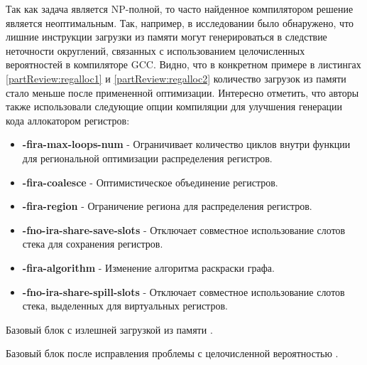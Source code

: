 Так как задача является NP-полной, то часто найденное компилятором решение является неоптимальным. Так, например, в исследовании  \cite{melnik2010case} было обнаружено, что лишние инструкции загрузки из памяти могут генерироваться в следствие неточности округлений, связанных с использованием целочисленных вероятностей в компиляторе GCC.  Видно, что в конкретном примере в листингах \ref{partReview:regalloc1} и  \ref{partReview:regalloc2} количество загрузок из памяти стало меньше после примененной оптимизации. Интересно отметить, что авторы также использовали следующие опции компиляции для улучшения генерации кода аллокатором регистров:
\begin{itemize}
\item \textbf{-fira-max-loops-num} - Ограничивает количество циклов внутри функции для региональной оптимизации распределения регистров.
\item \textbf{-fira-coalesce} - Оптимистическое объединение регистров.
\item \textbf{-fira-region} - Ограничение региона для распределения регистров.
\item \textbf{-fno-ira-share-save-slots} - Отключает совместное использование слотов стека для сохранения регистров.
\item \textbf{-fira-algorithm} - Изменение алгоритма раскраски графа.
\item \textbf{-fno-ira-share-spill-slots} - Отключает совместное использование слотов стека, выделенных для виртуальных регистров.
\end{itemize}
\begin{ListingEnv}[!h]
	\captiondelim{ } 
	\caption{Базовый блок с излешней загрузкой из памяти \cite{melnik2010case}.}\label{partReview:regalloc1}
	
\end{ListingEnv}

\begin{ListingEnv}[!h]
	\captiondelim{ } 
	\caption{Базовый блок после исправления проблемы с целочисленной вероятностью \cite{melnik2010case}.}\label{partReview:regalloc2}
	
\end{ListingEnv}



